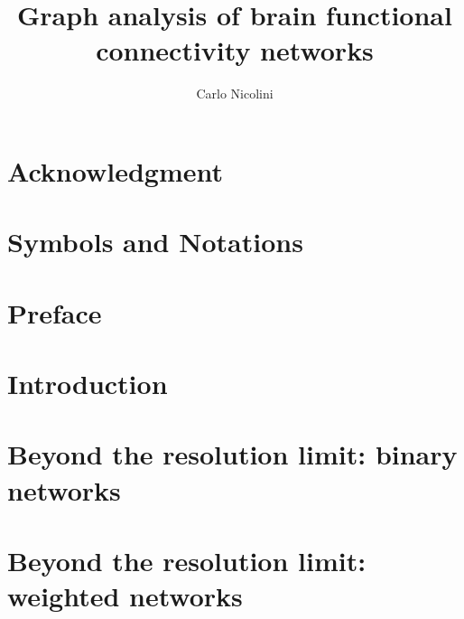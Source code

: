 
%

\title{Graph analysis of brain functional connectivity networks}
\author{Carlo Nicolini}

\newtheorem{obs}{Observation}
\newtheorem{props}{Proposition}



\maketitle
{}

\tableofcontents
\listoftodos

\chapter*{Acknowledgment}


\chapter*{Symbols and Notations}



\chapter*{Preface}\label{chap:preface}



\chapter{Introduction}\label{chap:introduction}
	

\chapter{Beyond the resolution limit: binary networks}\label{chap:surprise}
	

\chapter{Beyond the resolution limit: weighted networks}\label{chap:asymptotical_surprise}
	

